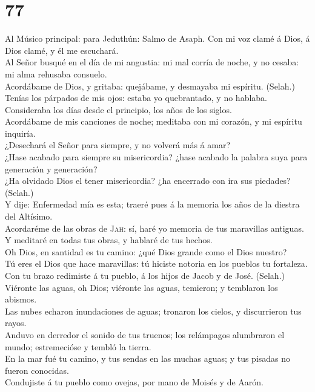 \hypertarget{section-76}{%
\section{77}\label{section-76}}

 Al Músico principal: para Jeduthún: Salmo de Asaph. Con
mi voz clamé á Dios, á Dios clamé, y él me escuchará.\\
 Al Señor busqué en el día de mi angustia: mi mal corría
de noche, y no cesaba: mi alma rehusaba consuelo.\\
 Acordábame de Dios, y gritaba: quejábame, y desmayaba mi
espíritu. (Selah.)\\
 Tenías los párpados de mis ojos: estaba yo quebrantado, y
no hablaba.\\
 Consideraba los días desde el principio, los años de los
siglos.\\
 Acordábame de mis canciones de noche; meditaba con mi
corazón, y mi espíritu inquiría.\\
 ¿Desechará el Señor para siempre, y no volverá más á
amar?\\
 ¿Hase acabado para siempre su misericordia? ¿hase acabado
la palabra suya para generación y generación?\\
 ¿Ha olvidado Dios el tener misericordia? ¿ha encerrado
con ira sus piedades? (Selah.)\\
 Y dije: Enfermedad mía es esta; traeré pues á la memoria
los años de la diestra del Altísimo.\\
 Acordaréme de las obras de \textsc{Jah}: sí, haré yo
memoria de tus maravillas antiguas.\\
 Y meditaré en todas tus obras, y hablaré de tus
hechos.\\
 Oh Dios, en santidad es tu camino: ¿qué Dios grande como
el Dios nuestro?\\
 Tú eres el Dios que hace maravillas: tú hiciste notoria
en los pueblos tu fortaleza.\\
 Con tu brazo redimiste á tu pueblo, á los hijos de Jacob
y de José. (Selah.)\\
 Viéronte las aguas, oh Dios; viéronte las aguas,
temieron; y temblaron los abismos.\\
 Las nubes echaron inundaciones de aguas; tronaron los
cielos, y discurrieron tus rayos.\\
 Anduvo en derredor el sonido de tus truenos; los
relámpagos alumbraron el mundo; estremecióse y tembló la tierra.\\
 En la mar fué tu camino, y tus sendas en las muchas
aguas; y tus pisadas no fueron conocidas.\\
 Condujiste á tu pueblo como ovejas, por mano de Moisés y
de Aarón.

